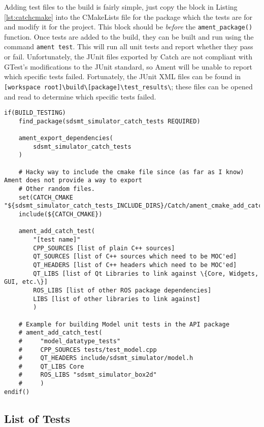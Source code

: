 Adding test files to the build is fairly simple, just copy the block in Listing \ref{lst:catchcmake} into the CMakeLists file for the package which the tests are for and modify it for the project. This block should be \textit{before} the \lstinline|ament_package()| function. Once tests are added to the build, they can be built and run using the command \lstinline|ament test|. This will run all unit tests and report whether they pass or fail. Unfortunately, the JUnit files exported by Catch are not compliant with GTest's modifications to the JUnit standard, so Ament will be unable to report which specific tests failed. Fortunately, the JUnit XML files can be found in \lstinline|[workspace root]\build\[package]\test_results\|; these files can be opened and read to determine which specific tests failed.

\begin{lstlisting}
if(BUILD_TESTING)
    find_package(sdsmt_simulator_catch_tests REQUIRED)

    ament_export_dependencies(
        sdsmt_simulator_catch_tests
    )

    # Hacky way to include the cmake file since (as far as I know) Ament does not provide a way to export
    # Other random files.
    set(CATCH_CMAKE "${sdsmt_simulator_catch_tests_INCLUDE_DIRS}/Catch/ament_cmake_add_catch_test.cmake")
    include(${CATCH_CMAKE})

    ament_add_catch_test(
        "[test name]"
        CPP_SOURCES [list of plain C++ sources]
        QT_SOURCES [list of C++ sources which need to be MOC'ed]
        QT_HEADERS [list of C++ headers which need to be MOC'ed]
        QT_LIBS [list of Qt Libraries to link against \{Core, Widgets, GUI, etc.\}]
        ROS_LIBS [list of other ROS package dependencies]
        LIBS [list of other libraries to link against]
        )

    # Example for building Model unit tests in the API package 
    # ament_add_catch_test(
    #     "model_datatype_tests"
    #     CPP_SOURCES tests/test_model.cpp
    #     QT_HEADERS include/sdsmt_simulator/model.h
    #     QT_LIBS Core
    #     ROS_LIBS "sdsmt_simulator_box2d"
    #     )
endif()
\end{lstlisting}

\subsection{List of Tests}
